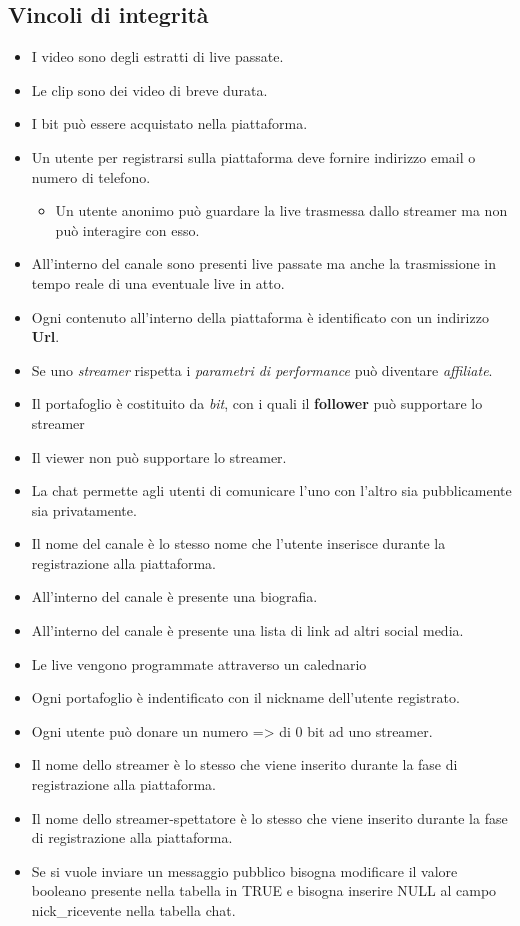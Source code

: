 \subsection{Vincoli di integrità}
\begin{itemize}
    \item I video sono degli estratti di live passate.
    \item Le clip sono dei video di breve durata.
    \item I bit può essere acquistato nella piattaforma.
    \item Un utente per registrarsi sulla piattaforma deve fornire indirizzo email o numero di telefono.
    \begin{itemize}
        \item Un utente anonimo può guardare la live trasmessa dallo streamer ma non può interagire con esso. 
    \end{itemize}
    \item All'interno del canale sono presenti live passate ma anche la trasmissione in tempo reale di una eventuale live in atto.
    \item Ogni contenuto all'interno della piattaforma è identificato con un indirizzo \textbf{Url}.
        \item Se uno \textit{streamer} rispetta i \textit{parametri di performance} può diventare \textit{affiliate}.
        \item Il portafoglio è costituito da \textit{bit}, con i quali il \textbf{follower} può supportare lo streamer
        \item Il viewer non può supportare lo streamer.
        \item La chat permette agli utenti di comunicare l'uno con l'altro sia pubblicamente sia privatamente.
        \item Il nome del canale è lo stesso nome che l'utente inserisce durante la registrazione alla piattaforma.
        \item All'interno del canale è presente una biografia. 
        \item All'interno del canale è presente una lista di link ad altri social media.
        \item Le live vengono programmate attraverso un calednario
        \item Ogni portafoglio è indentificato con il nickname dell'utente registrato. 
        \item Ogni utente può donare un numero => di 0 bit ad uno streamer. 
        \item Il nome dello streamer è lo stesso che viene inserito durante la fase di registrazione alla piattaforma.
        \item Il nome dello streamer-spettatore è lo stesso che viene inserito durante la fase di registrazione alla piattaforma.
        \item Se si vuole inviare un messaggio pubblico bisogna modificare il valore booleano presente nella tabella in TRUE e bisogna inserire NULL al campo nick\_ricevente nella tabella chat.
\end{itemize}